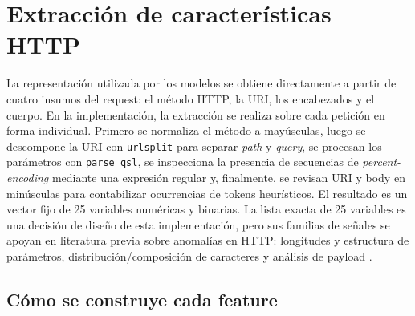 \documentclass[12pt,oneside]{report}
\begin{document}
\section{Extracción de características HTTP}
La representación utilizada por los modelos se obtiene directamente a partir de cuatro insumos del request: el método HTTP, la URI, los encabezados y el cuerpo. En la implementación, la extracción se realiza sobre cada petición en forma individual. Primero se normaliza el método a mayúsculas, luego se descompone la URI con \texttt{urlsplit} para separar \textit{path} y \textit{query}, se procesan los parámetros con \texttt{parse\_qsl}, se inspecciona la presencia de secuencias de \textit{percent-encoding} mediante una expresión regular y, finalmente, se revisan URI y body en minúsculas para contabilizar ocurrencias de tokens heurísticos. El resultado es un vector fijo de 25 variables numéricas y binarias. La lista exacta de 25 variables es una decisión de diseño de esta implementación, pero sus familias de señales se apoyan en literatura previa sobre anomalías en HTTP: longitudes y estructura de parámetros, distribución/composición de caracteres y análisis de payload \cite{kruegel_vigna_2003,ingham_inoue_2007,wang_stolfo_2004}.

\subsection{Cómo se construye cada feature}
\end{document}
